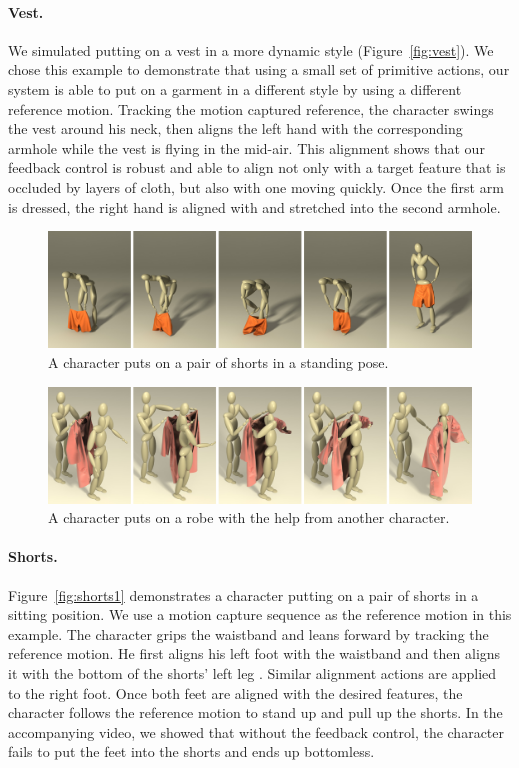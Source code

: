 \paragraph{Vest.} We simulated putting on a vest in a more dynamic style (Figure~\ref{fig:vest}). We chose this example to demonstrate that using a small set of primitive actions, our system is able to put on a garment in a different style by using a different reference motion. Tracking the motion captured reference, the character swings the vest around his neck, then aligns the left hand with the corresponding armhole while the vest is flying in the mid-air. This alignment shows that our feedback control is robust and able to align not only with a target feature that is occluded by layers of cloth, but also with one moving quickly. Once the first arm is dressed, the right hand is aligned with and stretched into the second armhole. 

\begin{figure}[!t]
  \centering
  \includegraphics[width=\textwidth]{images/shortsStanding}
  \caption{A character puts on a pair of shorts in a standing pose.}
  \label{fig:shorts2}
\end{figure}

\begin{figure}[!t]
  \centering
  \includegraphics[width=\textwidth]{images/robe}
  \caption{A character puts on a robe with the help from another character.}
  \label{fig:robe}
\end{figure}

\paragraph{Shorts.} Figure~\ref{fig:shorts1} demonstrates a character putting on a pair of shorts in a sitting position. We use a motion capture sequence as the reference motion in this example. The character grips the waistband and leans forward by tracking the reference motion. He first aligns his left foot with the waistband and then aligns it with the bottom of the shorts' left leg .  Similar alignment actions are applied to the right foot. Once both feet are aligned with the desired features, the character follows the reference motion to stand up and pull up the shorts. In the accompanying video, we showed that without the feedback control, the character fails to put the feet into the shorts and ends up bottomless.

